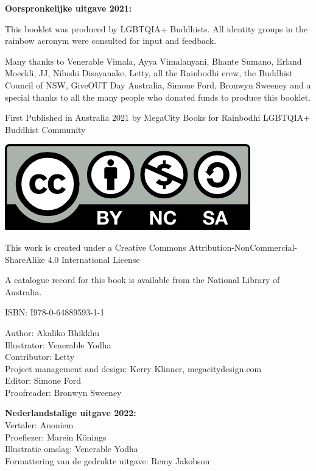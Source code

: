 \documentclass[12pt,openany]{book}
\begin{document}
\medskip

{\footnotesize
\begin{center}
\noindent \textbf{Oorspronkelijke uitgave 2021:} 

This booklet was produced by LGBTQIA+ Buddhists. All identity groups in the rainbow acronym were consulted for input and feedback.

\noindent Many thanks to Venerable Vimala, Ayya Vimalanyani, Bhante Sumano, Erland Moeckli, JJ, Nilushi Disayanake, Letty, all the Rainbodhi crew, the Buddhist Council of NSW, GiveOUT Day Australia, Simone Ford, Bronwyn Sweeney and a special thanks to all the many people who donated funds to produce this booklet.

\medskip

\noindent First Published in Australia 2021 by MegaCity Books for Rainbodhi LGBTQIA+ Buddhist Community

\smallskip

\includegraphics{by-nc-sa}

\noindent This work is created under a Creative Commons Attribution-NonCommercial-ShareAlike 4.0 International License

\noindent A catalogue record for this book is available from the National Library of Australia.

\medskip

\noindent ISBN: I978-0-64889593-1-1

\medskip

Author: Akaliko Bhikkhu \\
Illustrator: Venerable Yodha \\
Contributor: Letty \\
Project management and design: Kerry Klinner, megacitydesign.com \\
Editor: Simone Ford \\
Proofreader: Bronwyn Sweeney

\bigskip

\textbf{Nederlandstalige uitgave 2022:}  \\
Vertaler: Anoniem \\
Proeflezer: Marein Könings \\
Illustratie omslag: Venerable Yodha \\
Formattering van de gedrukte uitgave: Remy Jakobson
\end{center}
}
\end{document}
